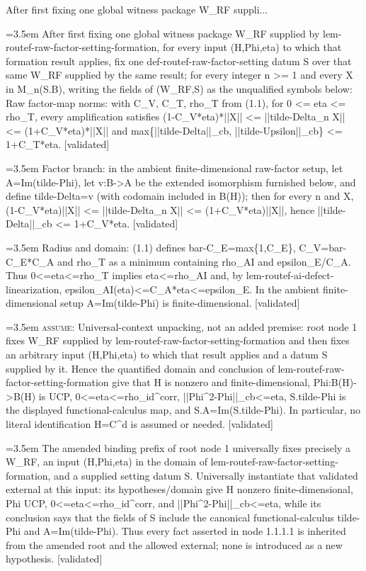 \documentclass{article}
\newcommand{\step}[1]{\par\noindent\hangindent=3.5em\hangafter=1%
  \makebox[3.5em][l]{\textbf{#1.}}}
\newcommand{\steptag}[1]{\hfill{\small\textsf{[#1]}}}
\begin{document}
\begin{proofbox}{After first fixing one global witness package W\_RF suppli...}
\step{1} After first fixing one global witness package W\_RF supplied by lem-routef-raw-factor-setting-formation, for every input (H,Phi,eta) to which that formation result applies, fix one def-routef-raw-factor-setting datum S over that same W\_RF supplied by the same result; for every integer n >= 1 and every X in M\_n(S.B), writing the fields of (W\_RF,S) as the unqualified symbols below: Raw factor-map norms: with C\_V, C\_T, rho\_T from (1.1), for 0 <= eta <= rho\_T, every amplification satisfies (1-C\_V*eta)*||X|| <= ||tilde-Delta\_n X|| <= (1+C\_V*eta)*||X|| and max\{||tilde-Delta||\_cb, ||tilde-Upsilon||\_cb\} <= 1+C\_T*eta. \steptag{validated} \\[6pt]
\step{1.1} Factor branch: in the ambient finite-dimensional raw-factor setup, let A=Im(tilde-Phi), let v:B->A be the extended isomorphism furnished below, and define tilde-Delta=v (with codomain included in B(H)); then for every n and X, (1-C\_V*eta)||X|| <= ||tilde-Delta\_n X|| <= (1+C\_V*eta)||X||, hence ||tilde-Delta||\_cb <= 1+C\_V*eta. \steptag{validated} \\[6pt]
\step{1.1.1} Radius and domain: (1.1) defines bar-C\_E=max\{1,C\_E\}, C\_V=bar-C\_E*C\_A and rho\_T as a minimum containing rho\_AI and epsilon\_E/C\_A. Thus 0<=eta<=rho\_T implies eta<=rho\_AI and, by lem-routef-ai-defect-linearization, epsilon\_AI(eta)<=C\_A*eta<=epsilon\_E. In the ambient finite-dimensional setup A=Im(tilde-Phi) is finite-dimensional. \steptag{validated} \\[6pt]
\step{1.1.1.1} \textsc{assume}: Universal-context unpacking, not an added premise: root node 1 fixes W\_RF supplied by lem-routef-raw-factor-setting-formation and then fixes an arbitrary input (H,Phi,eta) to which that result applies and a datum S supplied by it. Hence the quantified domain and conclusion of lem-routef-raw-factor-setting-formation give that H is nonzero and finite-dimensional, Phi:B(H)->B(H) is UCP, 0<=eta<=rho\_id\textasciicircum{}corr, ||Phi\textasciicircum{}2-Phi||\_cb<=eta, S.tilde-Phi is the displayed functional-calculus map, and S.A=Im(S.tilde-Phi). In particular, no literal identification H=C\textasciicircum{}d is assumed or needed. \steptag{validated} \\[6pt]
\step{1.1.1.1.1} The amended binding prefix of root node 1 universally fixes precisely a W\_RF, an input (H,Phi,eta) in the domain of lem-routef-raw-factor-setting-formation, and a supplied setting datum S. Universally instantiate that validated external at this input: its hypotheses/domain give H nonzero finite-dimensional, Phi UCP, 0<=eta<=rho\_id\textasciicircum{}corr, and ||Phi\textasciicircum{}2-Phi||\_cb<=eta, while its conclusion says that the fields of S include the canonical functional-calculus tilde-Phi and A=Im(tilde-Phi). Thus every fact asserted in node 1.1.1.1 is inherited from the amended root and the allowed external; none is introduced as a new hypothesis. \steptag{validated} \\[6pt]

\end{proofbox}
\end{document}
